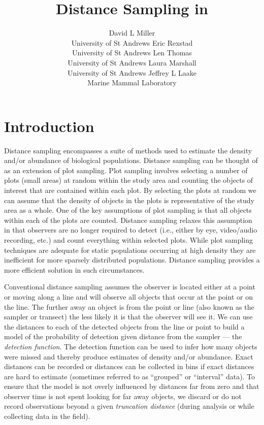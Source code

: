 \documentclass[article]{jss}\usepackage[]{graphicx}\usepackage[]{color}
\author{David L Miller\\University of St Andrews \AND
        Eric Rexstad\\University of St Andrews \And
        Len Thomas\\University of St Andrews \AND
        Laura Marshall\\University of St Andrews \And
        Jeffrey L Laake\\Marine Mammal Laboratory}
\title{Distance Sampling in \proglang{R}}
\begin{document}
\section{Introduction}


Distance sampling \citep{Buckland:2001vm, Buckland:2004ts, buckland2015distance} encompasses a suite of methods used to estimate the density and/or abundance of biological populations. Distance sampling can be thought of as an extension of plot sampling. Plot sampling involves selecting a number of plots (small areas) at random within the study area and counting the objects of interest that are contained within each plot. By selecting the plots at random we can assume that the density of objects in the plots is representative of the study area as a whole. One of the key assumptions of plot sampling is that all objects within each of the plots are counted. Distance sampling relaxes this assumption in that observers are no longer required to detect (i.e., either by eye, video/audio recording, etc.) and count everything within selected plots. While plot sampling techniques are adequate for static populations occurring at high density they are inefficient for more sparsely distributed populations. Distance sampling provides a more efficient solution in such circumstances.

Conventional distance sampling assumes the observer is located either at a point or moving along a line and will observe all objects that occur at the point or on the line. The further away an object is from the point or line (also known as the sampler or transect) the less likely it is that the observer will see it. We can use the distances to each of the detected objects from the line or point to build a model of the probability of detection given distance from the sampler --- the \textit{detection function}. The detection function can be used to infer how many objects were missed and thereby produce estimates of density and/or abundance. Exact distances can be recorded or distances can be collected in bins if exact distances are hard to estimate (sometimes referred to as ``grouped'' or ``interval'' data). To ensure that the model is not overly influenced by distances far from zero and that observer time is not spent looking for far away objects, we discard or do not record observations beyond a given \textit{truncation distance} (during analysis or while collecting data in the field).
\end{document}
